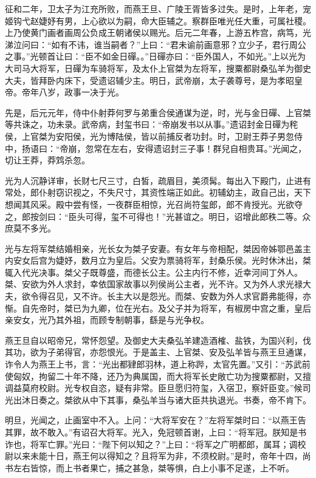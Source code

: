 \documentclass[12pt,UTF8]{ctexbook}
\begin{document}
征和二年，卫太子为江充所败，而燕王旦、广陵王胥皆多过失。是时，上年老，宠姬钩弋赵婕妤有男，上心欲以为嗣，命大臣辅之。察群臣唯光任大重，可属社稷。上乃使黄门画者画周公负成王朝诸侯以赐光。后元二年春，上游五柞宫，病笃，光涕泣问曰：“如有不讳，谁当嗣者？”上曰：“君未谕前画意邪？立少子，君行周公之事。”光顿首让曰：“臣不如金日磾。。”日磾亦曰：“臣外国人，不如光。”上以光为大司马大将军，日磾为车骑将军，及太仆上官桀为左将军，搜粟都尉桑弘羊为御史大夫，皆拜卧内床下，受遗诏辅少主。明日，武帝崩，太子袭尊号，是为孝昭皇帝。帝年八岁，政事一决于光。



先是，后元元年，侍中仆射莽何罗与弟重合侯通谋为逆，时，光与金日磾、上官桀等共诛之，功未录。武帝病，封玺书曰：“帝崩发书以从事。”遗诏封金日磾为秺侯，上官桀为安阳侯，光为博陆侯，皆以前捕反者功封。时，卫尉王莽子男忽侍中，扬语曰：“帝崩，忽常在左右，安得遗诏封三子事！群兒自相贵耳。”光闻之，切让王莽，莽鸩杀忽。



光为人沉静详审，长财七尺三寸，白皙，疏眉目，美须髯。每出入下殿门，止进有常处，郎仆射窃识视之，不失尺寸，其资性端正如此。初辅幼主，政自己出，天下想闻其风采。殿中尝有怪，一夜群臣相惊，光召尚符玺郎，郎不肯授光。光欲夺之，郎按剑曰：“臣头可得，玺不可得也！”光甚谊之。明日，诏增此郎秩二等。众庶莫不多光。



光与左将军桀结婚相亲，光长女为桀子安妻。有女年与帝相配，桀因帝姊鄂邑盖主内安女后宫为婕妤，数月立为皇后。父安为票骑将军，封桑乐侯。光时休沐出，桀辄入代光决事。桀父子既尊盛，而德长公主。公主内行不修，近幸河间丁外人。桀、安欲为外人求封，幸依国家故事以列侯尚公主者，光不许。又为外人求光禄大夫，欲令得召见，又不许。长主大以是怨光。而桀、安数为外人求官爵弗能得，亦惭。自先帝时，桀已为九卿，位在光右。及父子并为将军，有椒房中宫之重，皇后亲安女，光乃其外祖，而顾专制朝事，繇是与光争权。



燕王旦自以昭帝兄，常怀怨望。及御史大夫桑弘羊建造酒榷、盐铁，为国兴利，伐其功，欲为子弟得官，亦怨恨光。于是盖主、上官桀、安及弘羊皆与燕王旦通谋，诈令人为燕王上书，言：“光出都肄郎羽林，道上称跸，太官先置。”又引：“苏武前使匈奴，拘留二十年不降，还乃为典属国，而大将军长史敞亡功为搜粟都尉，又擅调益莫府校尉。光专权自恣，疑有非常。臣旦愿归符玺，入宿卫，察奸臣变。”候司光出沐日奏之。桀欲从中下其事，桑弘羊当与诸大臣共执退光。书奏，帝不肯下。



明旦，光闻之，止画室中不入。上问：“大将军安在？”左将军桀时曰：“以燕王告其罪，故不敢入。”有诏召大将军。光入，免冠顿首谢，上曰：“将军冠。朕知是书诈也，将军亡罪。”光曰：“陛下何以知之？”上曰：“将军之广明都郎，属耳；调校尉以来未能十日，燕王何以得知之？且将军为非，不须校尉。”是时，帝年十四，尚书左右皆惊，而上书者果亡，捕之甚急，桀等惧，白上小事不足遂，上不听。
\end{document}
